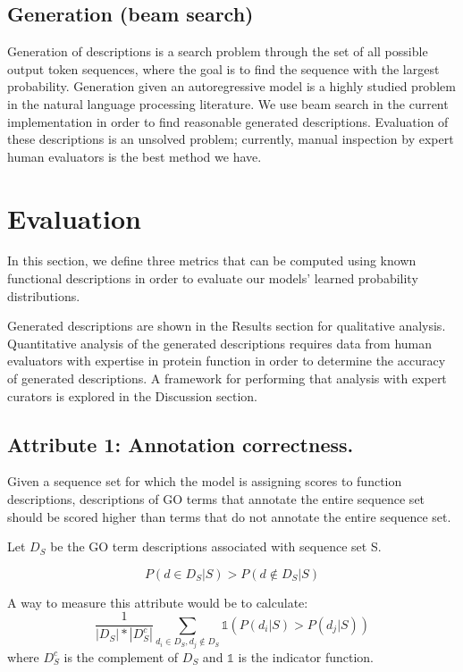 \documentclass{article}
\begin{document}
    \subsection{Generation (beam search)}
    Generation of descriptions is a search problem through the set of all possible output token sequences, where the goal is to find the sequence with the largest probability. Generation given an autoregressive model is a highly studied problem in the natural language processing literature.%
    We use beam search in the current implementation in order to find reasonable generated descriptions. Evaluation of these descriptions is an unsolved problem; currently, manual inspection by expert human evaluators is the best method we have.

\section{Evaluation}
In this section, we define three metrics that can be computed using known functional descriptions in order to evaluate our models' learned probability distributions.

Generated descriptions are shown in the Results section for qualitative analysis.
Quantitative analysis of the generated descriptions requires data from human evaluators with expertise in protein function in order to determine the accuracy of generated descriptions.
A framework for performing that analysis with expert curators is explored in the Discussion section.
        \subsection{Attribute 1: Annotation correctness.}

        Given a sequence set for which the model is assigning scores to function descriptions, descriptions of GO terms that annotate the entire sequence set should be scored higher than terms that do not annotate the entire sequence set.

        Let $D_{S}$ be the GO term descriptions associated with sequence set S.

        \[P(d \in D_{S} | S) > P(d \notin D_{S} | S)\]

        A way to measure this attribute would be to calculate:
        \[\frac{1}{|D_{S}|*|D_{S}^{c}|}\sum_{d_i \in D_{S}, d_j \notin D_{S}} \mathds{1}(P(d_i | S) > P(d_j | S))\]
        where $D_{S}^{c}$ is the complement of $D_{S}$ and $\mathds{1}$ is the indicator function.
\end{document}
